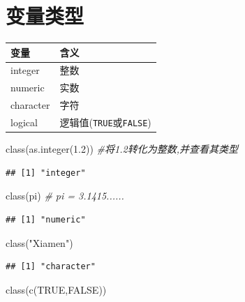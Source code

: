\documentclass[
]{book}
\newenvironment{Shaded}{\begin{snugshade}}{\end{snugshade}}
\newcommand{\CommentTok}[1]{\textcolor[rgb]{0.56,0.35,0.01}{\textit{#1}}}
\newcommand{\ConstantTok}[1]{\textcolor[rgb]{0.00,0.00,0.00}{#1}}
\newcommand{\FloatTok}[1]{\textcolor[rgb]{0.00,0.00,0.81}{#1}}
\newcommand{\FunctionTok}[1]{\textcolor[rgb]{0.00,0.00,0.00}{#1}}
\newcommand{\NormalTok}[1]{#1}
\newcommand{\StringTok}[1]{\textcolor[rgb]{0.31,0.60,0.02}{#1}}
\begin{document}
\hypertarget{ux53d8ux91cfux7c7bux578b}{%
\section{变量类型}\label{ux53d8ux91cfux7c7bux578b}}

\begin{longtable}[]{@{}ll@{}}
\toprule
变量 & 含义 \\
\midrule
\endhead
integer & 整数 \\
numeric & 实数 \\
character & 字符 \\
logical & 逻辑值(\texttt{TRUE}或\texttt{FALSE}) \\
\bottomrule
\end{longtable}

\begin{Shaded}
\begin{Highlighting}[]
\FunctionTok{class}\NormalTok{(}\FunctionTok{as.integer}\NormalTok{(}\FloatTok{1.2}\NormalTok{)) }\CommentTok{\#将1.2转化为整数,并查看其类型}
\end{Highlighting}
\end{Shaded}

\begin{verbatim}
## [1] "integer"
\end{verbatim}

\begin{Shaded}
\begin{Highlighting}[]
\FunctionTok{class}\NormalTok{(pi) }\CommentTok{\# pi = 3.1415......}
\end{Highlighting}
\end{Shaded}

\begin{verbatim}
## [1] "numeric"
\end{verbatim}

\begin{Shaded}
\begin{Highlighting}[]
\FunctionTok{class}\NormalTok{(}\StringTok{"Xiamen"}\NormalTok{)}
\end{Highlighting}
\end{Shaded}

\begin{verbatim}
## [1] "character"
\end{verbatim}

\begin{Shaded}
\begin{Highlighting}[]
\FunctionTok{class}\NormalTok{(}\FunctionTok{c}\NormalTok{(}\ConstantTok{TRUE}\NormalTok{,}\ConstantTok{FALSE}\NormalTok{))}
\end{Highlighting}
\end{Shaded}
\end{document}
